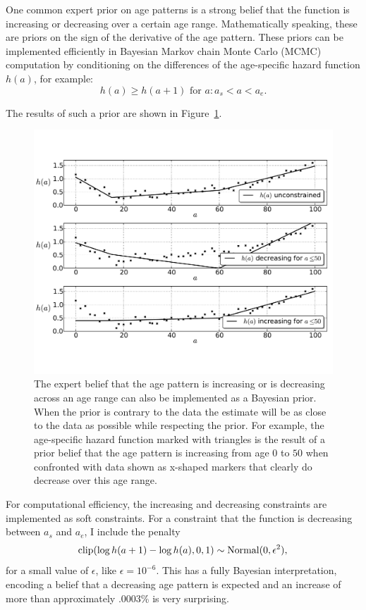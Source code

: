 One common expert prior on age patterns is a strong belief that the
function is increasing or decreasing over a certain age
range. Mathematically speaking, these are priors on the sign of the
derivative of the age pattern.  These priors can be implemented efficiently in
Bayesian Markov chain Monte Carlo (MCMC) computation by conditioning on the differences of the
age-specific hazard function $h(a)$, for example:
\[
h(a) \geq h(a+1) \text{ for } a : a_s < a < a_e.
\]

The results of such a prior are shown in
Figure~\ref{monotone-age-pattern}.


\begin{figure}[h]
\begin{center}
\includegraphics[width=\textwidth]{monotone-smoothing-splines.pdf}
\caption{The expert belief that the age pattern is increasing or is
  decreasing across an age range can also be implemented as a Bayesian
  prior.  When the prior is contrary to the data the estimate will be
  as close to the data as possible while respecting the prior.  For
  example, the age-specific hazard function marked with triangles is the result
  of a prior belief that the age pattern is increasing from age $0$ to
  $50$ when confronted with data shown as x-shaped markers that
  clearly do decrease over this age range.}
\label{monotone-age-pattern}
\end{center}
\end{figure}


For computational efficiency, the increasing and decreasing
constraints are implemented as soft constraints.  For a constraint
that the function is decreasing between $a_s$ and $a_e$, I include the penalty
\[
\operatorname{clip}(\log h(a+1) - \log h(a), 0, 1) \sim \operatorname{Normal}(0, \epsilon^2),
\]
for a small value of $\epsilon$, like $\epsilon = 10^{-6}$.  This has
a fully Bayesian interpretation, encoding a belief that a decreasing age pattern is expected
and an increase of more than approximately .0003\% is very surprising.


